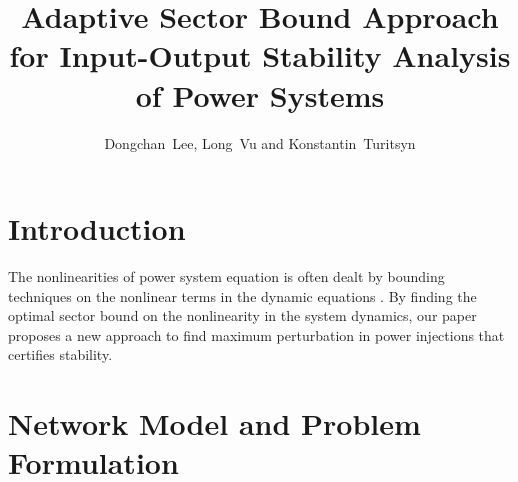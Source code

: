 \documentclass[journal]{IEEEtran}
\theoremstyle{definition}
\begin{document}
\title{Adaptive Sector Bound Approach for Input-Output Stability Analysis of Power Systems}
\author{Dongchan~Lee, Long~Vu and Konstantin~Turitsyn}

\maketitle



\IEEEpeerreviewmaketitle


\section{Introduction}
The nonlinearities of power system equation is often dealt by bounding techniques on the nonlinear terms in the dynamic equations \cite{vu16lyap,lee17}. 
By finding the optimal sector bound on the nonlinearity in the system dynamics, our paper proposes a new approach to find maximum perturbation in power injections that certifies stability.

\section{Network Model and Problem Formulation}
\end{document}
